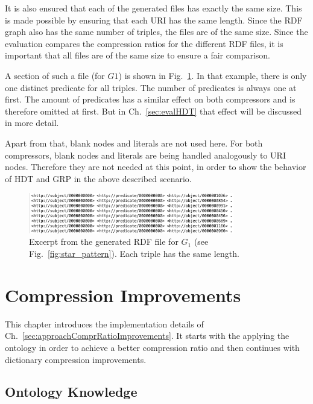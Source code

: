 It is also ensured that each of the generated files has exactly the same size. This is made possible by ensuring that each URI has the same length. Since the RDF graph also has the same number of triples, the files are of the same size. Since the evaluation compares the compression ratios for the different RDF files, it is important that all files are of the same size to ensure a fair comparison.

A section of such a file (for $G1$) is shown in Fig.~\ref{fig:rdfFile}. In that example, there is only one distinct predicate for all triples. The number of predicates is always one at first. The amount of predicates has a similar effect on both compressors and is therefore omitted at first. But in Ch.~\ref{sec:evalHDT} that effect will be discussed in more detail.

Apart from that, blank nodes and literals are not used here. For both compressors, blank nodes and literals are being handled analogously to URI nodes. Therefore they are not needed at this point, in order to show the behavior of HDT and GRP in the above described scenario.

\begin{figure}[h]
	\centering
	\includegraphics[width=0.8\textwidth]{figures/GRPvsHDT/file.png}
	\caption{Excerpt from the generated RDF file for $G_1$ (see Fig.~\ref{fig:star_pattern}). Each triple has the same length.}
	\label{fig:rdfFile}
\end{figure}

\section{Compression Improvements}\label{sec:implementationComprRatioImprovements}

This chapter introduces the implementation details of Ch.~\ref{sec:approachComprRatioImprovements}. It starts with the applying the ontology in order to achieve a better compression ratio and then continues with dictionary compression  improvements.

\subsection{Ontology Knowledge}\label{sec:implementationOntKnowledge}

